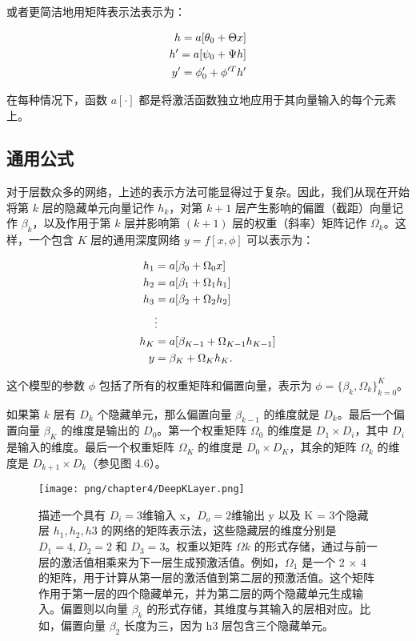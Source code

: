 或者更简洁地用矩阵表示法表示为：


\begin{align}
	h = a[\theta_0 + \Theta x] \notag \\
	h' = a[\psi_0 + \Psi h] \notag \\
	y' = \phi_0' + \phi'^T h' 
\end{align} 


在每种情况下，函数 \(a[\cdot]\) 都是将激活函数独立地应用于其向量输入的每个元素上。

\subsection{通用公式}
对于层数众多的网络，上述的表示方法可能显得过于复杂。因此，我们从现在开始将第 \(k\) 层的隐藏单元向量记作 \(h_k\)，对第 \(k+1\) 层产生影响的偏置（截距）向量记作 \(\beta_k\)，以及作用于第 \(k\) 层并影响第 \((k+1)\) 层的权重（斜率）矩阵记作 \(\Omega_k\)。这样，一个包含 \(K\) 层的通用深度网络 \(y = f[x, \phi]\) 可以表示为：


\begin{align}
	h_1 &= a[\beta_0 + \Omega_0 x] \notag \\
	h_2 &= a[\beta_1 + \Omega_1 h_1] \notag \\
	h_3 &= a[\beta_2 + \Omega_2 h_2] \notag \\
	& \vdots \notag \\
	h_K &= a[\beta_{K-1} + \Omega_{K-1}h_{K-1}] \notag \\
	y &= \beta_K + \Omega_K h_K. 
\end{align}

这个模型的参数 \(\phi\) 包括了所有的权重矩阵和偏置向量，表示为 \(\phi = \{ \beta_k, \Omega_k \}^{K}_{k=0}\)。

如果第 \(k\) 层有 \(D_k\) 个隐藏单元，那么偏置向量 \(\beta_{k-1}\) 的维度就是 \(D_k\)。最后一个偏置向量 \(\beta_K\) 的维度是输出的 \(D_0\)。第一个权重矩阵 \(\Omega_0\) 的维度是 \(D_1 \times D_i\)，其中 \(D_i\) 是输入的维度。最后一个权重矩阵 \(\Omega_K\) 的维度是 \(D_0 \times D_K\)，其余的矩阵 \(\Omega_k\) 的维度是 \(D_{k+1} \times D_k\)（参见图 4.6）。

\begin{figure}[ht!]
	\centering
	\texttt{[image: png/chapter4/DeepKLayer.png]}
	\caption{描述一个具有 \(D_i = 3\)维输入 x，\(D_o = 2\)维输出 y 以及 K = 3个隐藏层 \(h_1, h_2, h3\) 的网络的矩阵表示法，这些隐藏层的维度分别是 \(D_1 = 4, D_2 = 2\) 和 \(D_3 = 3\)。权重以矩阵 \(\Omega k\) 的形式存储，通过与前一层的激活值相乘来为下一层生成预激活值。例如，\(\Omega_1\) 是一个 2 × 4 的矩阵，用于计算从第一层的激活值到第二层的预激活值。这个矩阵作用于第一层的四个隐藏单元，并为第二层的两个隐藏单元生成输入。偏置则以向量 \(\beta_k\) 的形式存储，其维度与其输入的层相对应。比如，偏置向量 \(\beta_2\) 长度为三，因为 h3 层包含三个隐藏单元。}
\end{figure}

